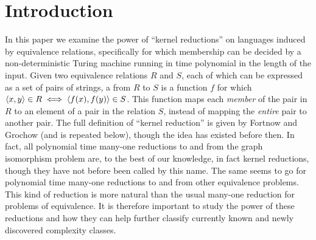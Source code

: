 \section{Introduction}

In this paper we examine the power of ``kernel reductions'' on languages induced by equivalence relations, specifically for which membership can be decided by a non-deterministic Turing machine running in time polynomial in the length of the input.
Given two equivalence relations $R$ and $S$, each of which can be expressed as a set of pairs of strings, a  from $R$ to $S$ is a function $f$ for which $\langle x,y\rangle\in R\iff\langle f(x),f(y)\rangle\in S$.
This function maps each \emph{member} of the pair in $R$ to an element of a pair in the relation $S$, instead of mapping the \emph{entire} pair to another pair.
The full definition of ``kernel reduction'' is given by Fortnow and Grochow \cite{fg11} (and is repeated below), though the idea has existed before then.
In fact, all polynomial time many-one reductions to and from the graph isomorphism problem are, to the best of our knowledge, in fact kernel reductions, though they have not before been called by this name.
The same seems to go for polynomial time many-one reductions to and from other equivalence problems.
This kind of reduction is more natural than the usual many-one reduction for problems of equivalence.
It is therefore important to study the power of these reductions and how they can help further classify currently known and newly discovered complexity classes.

